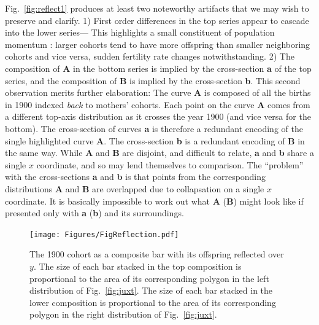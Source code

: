 \documentclass{article}
\begin{document}
Fig.~\ref{fig:reflect1} produces at least two noteworthy artifacts that we may wish to preserve and clarify. 1) First order differences in the top series appear to cascade into the lower series--- This highlights a small constituent of population momentum \citep{keyfitz1971momentum}: larger cohorts tend to have more offspring than smaller neighboring cohorts and vice versa, sudden fertility rate changes notwithstanding. 2) The composition of \textbf{A} in the bottom series is implied by the cross-section \textbf{a} of the top series, and the composition of \textbf{B} is implied by the cross-section \textbf{b}. This second observation merits further elaboration: The curve \textbf{A} is composed of all the births in 1900 indexed \emph{back} to mothers' cohorts. Each point on the curve \textbf{A} comes from a different top-axis distribution as it crosses the year 1900 (and vice versa for the bottom). The cross-section of curves \textbf{a} is therefore a redundant encoding of the single highlighted curve \textbf{A}. The cross-section \textbf{b} is a redundant encoding of \textbf{B} in the same way. While \textbf{A} and \textbf{B} are disjoint, and difficult to relate, \textbf{a} and \textbf{b} share a single $x$ coordinate, and so may lend themselves to comparison. The ``problem'' with the cross-sections \textbf{a} and \textbf{b} is that points from the corresponding distributions \textbf{A} and \textbf{B} are overlapped due to collapsation on a single $x$ coordinate. It is basically impossible to work out what \textbf{A} (\textbf{B}) might look like if presented only with \textbf{a} (\textbf{b}) and its surroundings. 
\pagebreak
\begin{figure}
 \centering
        \texttt{[image: Figures/FigReflection.pdf]}
        \caption{The 1900 cohort as a composite bar with its offspring reflected over $y$. The size of each bar stacked in the top composition is proportional to the area of its corresponding polygon in the left distribution of Fig.~\ref{fig:juxt}. The size of each bar stacked in the lower composition is proportional to the area of its corresponding polygon in the right distribution of Fig.~\ref{fig:juxt}.}
          \label{fig:refl}
\end{figure}
\end{document}
